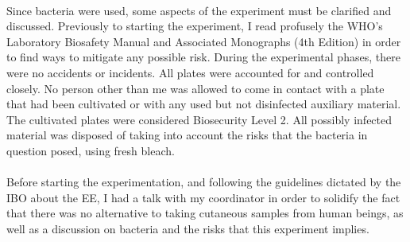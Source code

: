 \paragraph{}Since bacteria were used, some aspects of the experiment must be clarified and discussed. Previously to starting the experiment, I read profusely the WHO's Laboratory Biosafety Manual and Associated Monographs (4th Edition)\cite{worldhealthorganizationLaboratoryBiosafetyManual2020} in order to find ways to mitigate any possible risk. During the experimental phases, there were no accidents or incidents. All plates were accounted for and controlled closely. No person other than me was allowed to come in contact with a plate that had been cultivated or with any used but not disinfected auxiliary material. The cultivated plates were considered Biosecurity Level 2. All possibly infected material was disposed of taking into account the risks that the bacteria in question posed, using fresh bleach.
\paragraph{}Before starting the experimentation, and following the guidelines dictated by the IBO about the EE, I had a talk with my coordinator in order to solidify the fact that there was no alternative to taking cutaneous samples from human beings, as well as a discussion on bacteria and the risks that this experiment implies.
